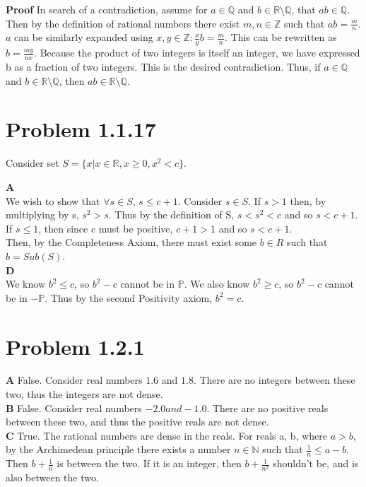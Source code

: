 \documentclass[10pt]{article} %
\begin{document}
\textbf{Proof} In search of a contradiction, assume for $a \in \mathbb{Q}$ and $b \in \mathbb{R}\setminus \mathbb{Q}$, that $ab \in \mathbb{Q}$. Then by the definition of rational numbers there exist $m,n \in \mathbb{Z}$ such that $ab = \frac{m}{n}$. $a$ can be similarly expanded using $x,y \in \mathbb{Z}: \frac{x}{y}b = \frac{m}{n}$. This can be rewritten as $b = \frac{my}{nx}$. Because the product of two integers is itself an integer, we have expressed b as a fraction of two integers. This is the desired contradiction. Thus, if $a \in \mathbb{Q}$ and $b \in \mathbb{R}\setminus \mathbb{Q}$, then $ab \in \mathbb{R}\setminus \mathbb{Q}$.

\section{Problem 1.1.17}
Consider set $S = \{x | x \in \mathbb{R}, x \geq 0, x^2 < c\}$.

\textbf{A}\\
We wish to show that $\forall s \in S$, $s \leq c + 1$. Consider $s \in S$. If $s > 1$ then, by multiplying by s, $s^2 > s$. Thus by the definition of S, $s < s^2 < c$ and so $s < c+1$. If $s \leq 1$, then since $c$ must be positive, $c + 1 > 1$ and so $s < c + 1$.\\

Then, by the Completeness Axiom, there must exist some $b \in R$ such that $b = Sub(S)$.\\

\textbf{D}\\
We know $b^2 \leq c$, so $b^2 - c$ cannot be in $\mathbb{P}$. We also know $b^2 \geq c$, so $b^2 - c$ cannot be in $-\mathbb{P}$. Thus by the second Positivity axiom, $b^2 = c$.\\


\section{Problem 1.2.1}
\textbf{A} False. Consider real numbers $1.6$ and $1.8$. There are no integers between these two, thus the integers are not dense.\\
\textbf{B} False. Consider real numbers $-2.0 and -1.0$. There are no positive reals between these two, and thus the positive reals are not dense.\\
\textbf{C} True. The rational numbers are dense in the reals. For reals a, b, where $a > b$, by the Archimedean principle there exists a number $n \in \mathbb{N}$ such that $\frac{1}{n} \leq a-b$. Then $b + \frac{1}{n}$ is between the two. If it is an integer, then $b + \frac{1}{n^2}$ shouldn't be, and is also between the two.
\end{document}
